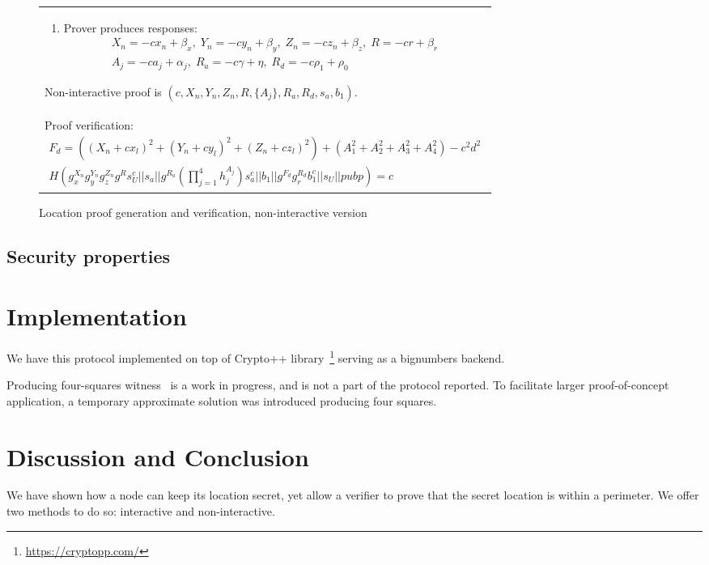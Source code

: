 \documentclass{article}
\begin{document}
\begin{figure}[!htb]
\begin{tabular}{|p{\linewidth}|}
\begin{enumerate}
\item
  Prover produces responses:
\begin{multline}
  X_n = -c x_n + \beta_x,  \;
  Y_n = -c y_n + \beta_y,  \;
  Z_n = -c z_n + \beta_z,   \;
  R = -c r + \beta_r   \\
  A_j = -c a_j + \alpha_j, \;
  R_a = -c \gamma + \eta,   \;
  R_d = -c \rho_1 + \rho_0
\end{multline}
\end{enumerate}
Non-interactive proof is
$(c, X_n, Y_n, Z_n, R, \{A_j\}, R_a, R_d, s_a, b_1)$.
\\
Proof verification:
\begin{multline}
\label{verf-chash}
  F_d = ((X_n + c x_l)^2 + (Y_n + c y_l)^2 + (Z_n + c z_l)^2) + (A_1^2 + A_2^2 + A_3^2 + A_4^2) - c^2 d^2 \\
  H(g_x^{X_n} g_y^{Y_n} g_z^{Z_n} g^{R} s_U^{c} ||
    s_a ||
    g^{R_a} (\prod_{j=1}^4 h_j^{A_j}) s_a^{c} ||
    b_1 ||
    g^{F_d} g_r^{R_d} b_1^c ||
    s_U ||
    pubp)
  = c
\end{multline}
\\
\hline
\end{tabular}
\caption{Location proof generation and verification, non-interactive version}
\label{ni_fig}
\end{figure}

\subsection{Security properties}


\section{Implementation}

We have this protocol implemented on top of {Crypto++} library~\footnote{\url{https://cryptopp.com/}}
serving as a bignumbers backend.

Producing four-squares witness~\cite{PollackTrevino} is a work in progress, and is not a part of the protocol reported.
To facilitate larger proof-of-concept application, a temporary approximate solution was introduced producing four squares.

\cite{Idemix}

\section{Discussion and Conclusion}

We have shown how a node can keep its location secret, yet allow a verifier to prove that the secret location is within a perimeter.
We offer two methods to do so: interactive and non-interactive.


% 


\end{document}
